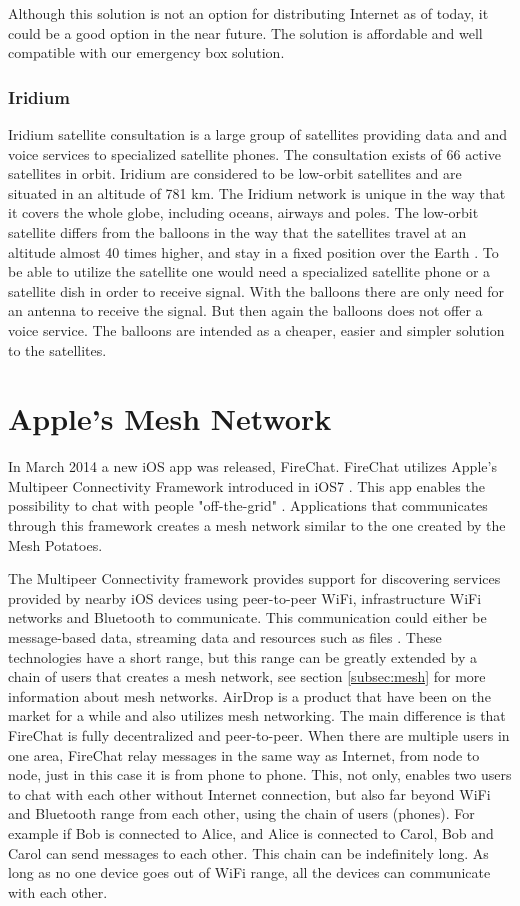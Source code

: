 Although this solution is not an option for distributing Internet as of today, it could be a good option in the near future. The solution is affordable and well compatible with our emergency box solution.

\subsubsection{Iridium}
Iridium satellite consultation is a large group of satellites providing data and and voice services to specialized satellite phones. The consultation exists of 66 active satellites in orbit. Iridium are considered to be low-orbit satellites and are situated in an altitude of 781 km. The Iridium network is unique in the way that it covers the whole globe, including oceans, airways and poles. The low-orbit satellite differs from the balloons in the way that the satellites travel at an altitude almost 40 times higher, and stay in a fixed position over the Earth \cite{iridium}. To be able to utilize the satellite one would need a specialized satellite phone or a satellite dish in order to receive signal. With the balloons there are only need for an antenna to receive the signal. But then again the balloons does not offer a voice service. The balloons are intended as a cheaper, easier and simpler solution to the satellites.                                         

\section{Apple's Mesh Network}
In March 2014 a new iOS app was released, FireChat. FireChat utilizes Apple's Multipeer Connectivity Framework introduced in iOS7 \cite{appleMesh}. This app enables the possibility to chat with people "off-the-grid" \cite{fireChat}. Applications that communicates through this framework creates a mesh network similar to the one created by the Mesh Potatoes. 

The Multipeer Connectivity framework provides support for discovering services provided by nearby iOS devices using peer-to-peer WiFi, infrastructure WiFi networks and Bluetooth to communicate. This communication could either be message-based data, streaming data and resources such as files \cite{multipeer}. These technologies have a short range, but this range can be greatly extended by a chain of users that creates a mesh network, see section \ref{subsec:mesh} for more information about mesh networks. AirDrop is a product that have been on the market for a while and also utilizes mesh networking. The main difference is that FireChat is fully decentralized and peer-to-peer. When there are multiple users in one area, FireChat relay messages in the same way as Internet, from node to node, just in this case it is from phone to phone.  This, not only, enables two users to chat with each other without Internet connection, but also far beyond WiFi and Bluetooth range from each other, using the chain of users (phones). For example if Bob is connected to Alice, and Alice is connected to Carol, Bob and Carol can send messages to each other. This chain can be indefinitely long. As long as no one device goes out of WiFi range, all the devices can communicate with each other. 

